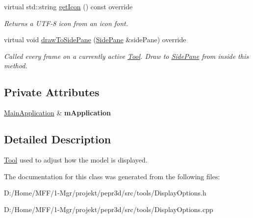 \begin{DoxyCompactItemize}
virtual std\+::string \mbox{\hyperlink{classpepr3d_1_1_display_options_a8f1a481272d7ebcc96c32937027be68c}{get\+Icon}} () const override
\begin{DoxyCompactList}\small\item\em Returns a U\+T\+F-\/8 icon from an icon font. \end{DoxyCompactList}\item 
\mbox{\label{classpepr3d_1_1_display_options_a403d402fdd5fdfcdcc24a206b9f1ef66}} 
virtual void \mbox{\hyperlink{classpepr3d_1_1_display_options_a403d402fdd5fdfcdcc24a206b9f1ef66}{draw\+To\+Side\+Pane}} (\mbox{\hyperlink{classpepr3d_1_1_side_pane}{Side\+Pane}} \&side\+Pane) override
\begin{DoxyCompactList}\small\item\em Called every frame on a currently active \mbox{\hyperlink{classpepr3d_1_1_tool}{Tool}}. Draw to \mbox{\hyperlink{classpepr3d_1_1_side_pane}{Side\+Pane}} from inside this method. \end{DoxyCompactList}\end{DoxyCompactItemize}
\subsection*{Private Attributes}
\begin{DoxyCompactItemize}
\item 
\mbox{\label{classpepr3d_1_1_display_options_ae51e9da0c45d0fee1aac00df4bc5f313}} 
\mbox{\hyperlink{classpepr3d_1_1_main_application}{Main\+Application}} \& {\bfseries m\+Application}
\end{DoxyCompactItemize}


\subsection{Detailed Description}
\mbox{\hyperlink{classpepr3d_1_1_tool}{Tool}} used to adjust how the model is displayed. 

The documentation for this class was generated from the following files\+:\begin{DoxyCompactItemize}
\item 
D\+:/\+Home/\+M\+F\+F/1-\/\+Mgr/projekt/pepr3d/src/tools/Display\+Options.\+h\item 
D\+:/\+Home/\+M\+F\+F/1-\/\+Mgr/projekt/pepr3d/src/tools/Display\+Options.\+cpp\end{DoxyCompactItemize}
